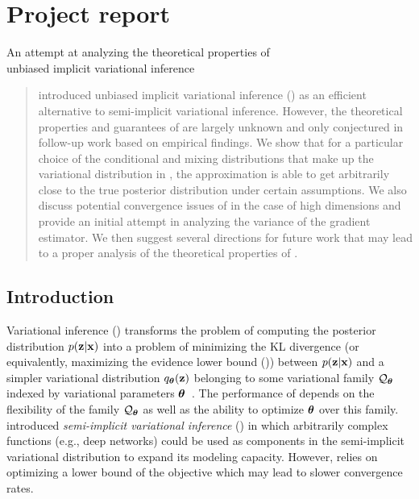 \documentclass[10pt]{article}
\begin{document}
\newpage


\section{Project report}

\begin{center}
\Large An attempt at analyzing the theoretical properties of\\unbiased implicit variational inference
\end{center}

\vspace{1em}
\begin{abstract}
\citet{Titsias:2019} introduced unbiased implicit variational inference (\uivi) as an efficient alternative to semi-implicit variational inference. However, the theoretical properties and guarantees of \uivi are largely unknown and only conjectured in follow-up work based on empirical findings. We show that for a particular choice of the conditional and mixing distributions that make up the variational distribution in \uivi, the \uivi approximation is able to get arbitrarily close to the true posterior distribution under certain assumptions. We also discuss potential convergence issues of \uivi in the case of high dimensions and provide an initial attempt in analyzing the variance of the \elbo gradient estimator. We then suggest several directions for future work that may lead to a proper analysis of the theoretical properties of \uivi.
\end{abstract}
\vspace{1em}

\subsection{Introduction} \label{sec:introduction}

Variational inference (\vi) transforms the problem of computing the posterior distribution $p(\mathbf{z}|\mathbf{x})$ into a problem of minimizing the KL divergence (or equivalently, maximizing the evidence lower bound (\elbo)) between $p(\mathbf{z}|\mathbf{x})$ and a simpler variational distribution $q_{\bm{\theta}}(\mathbf{z})$ belonging to some variational family $\mathcal{Q}_{\bm{\theta}}$ indexed by variational parameters ${\bm{\theta}}$~\citep{Jordan:1999}. The performance of \vi depends on the flexibility of the family $\mathcal{Q}_{\bm{\theta}}$ as well as the ability to optimize ${\bm{\theta}}$ over this family. \citet{Yin:2018} introduced \textit{semi-implicit variational inference} (\sivi) in which arbitrarily complex functions (e.g., deep networks) could be used as components in the semi-implicit variational distribution to expand its modeling capacity. However, \sivi relies on optimizing a lower bound of the \elbo objective which may lead to slower convergence rates.
\\
\end{document}
